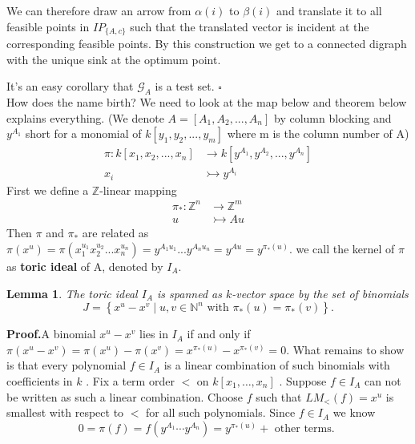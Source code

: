 \documentclass{article}
\theoremstyle{plain}
\newtheorem{lemma}[theorem]{Lemma}
\theoremstyle{definition}
\begin{document}
We can therefore draw an arrow from $\alpha(i)$ to $\beta(i)$ and translate it to all feasible points in $IP_{\{A,c\}}$ such that the translated vector is incident at the corresponding feasible points. By this construction we get to a connected digraph with the unique sink at the optimum point. 

It's an easy corollary that $\mathcal{G}_{A}$ is a test set. \hfill $\square$ \\

How does the name birth? We need to look at the map below and theorem  below explains everything. (We denote $A=[A_1,A_2,...,A_n]$ by column blocking and $y^{A_1}$ short for a monomial of $k[y_1,y_2,...,y_m]$ where m is the column number of A)
\begin{align*}
\pi:  k[x_1,x_2,...,x_n] & \to k[y^{A_1},y^{A_2},...,y^{A_n}] \\
 x_{i} & \rightarrowtail y^{A_i}
\end{align*}
First we define a $\mathbb{Z}$-linear mapping
\begin{align*}
 \pi_*:  \mathbb{Z}^{n} & \to\mathbb{Z}^{m} \\
 u & \rightarrowtail  Au
\end{align*}
Then $\pi$ and $\pi_*$ are related as $\pi(x^u)=\pi(x_{1}^{u_1}x_{2}^{u_2}...x_{n}^{u_n})=y^{A_1 u_1}...y^{A_n u_n}=y^{A u}=y^{\pi_*(u)}$.
 we call the kernel of $\pi$ as \textbf{toric ideal} of A, denoted by $I_A$. \\
 
 \begin{lemma}The toric ideal  $I_{A}$  is spanned as  $k$-vector space by the set of binomials  $$J=\left\{x^{u}-x^{v} \mid u, v \in \mathbb{N}^{n} \text { with } \pi_* (u)=\pi_* (v)\right\}. $$ \end{lemma}
 
\noindent\textbf{Proof.}A binomial  $x^{u}-x^{v}$  lies in $ I_{A}$  if and only if  $\pi\left(x^{u}-x^{v}\right)=\pi\left(x^{u}\right)-\pi\left(x^{v}\right)=   x^{\pi_*(u)}-x^{\pi_*(v)}=0$. What remains to show is that every polynomial  $f \in I_{A}$  is a linear combination of such binomials with coefficients in  $k$ . Fix a term order  $<$  on $ k\left[x_{1}, \ldots, x_{n}\right]$ . Suppose $ f \in I_{A} $ can not be written as such a linear combination. Choose $ f $ such that  $L M_{<}(f)=x^{u}$  is smallest with respect to  $<$  for all such polynomials. Since  $f \in I_{A}$  we know
$$0=\pi(f)=f\left(y^{A_{1}} \cdots y^{A_{n}}\right)=y^{\pi_*(u)}+\text { other terms. }$$
\end{document}
